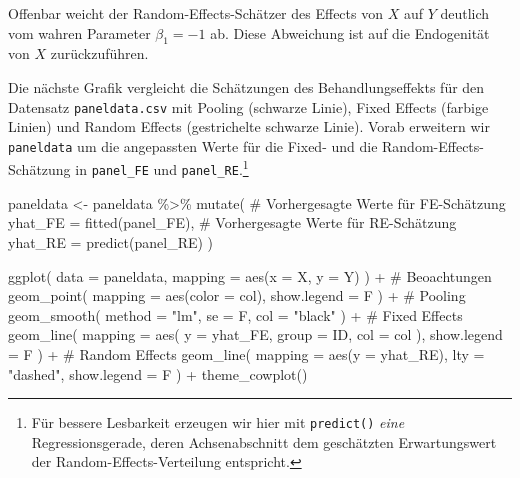 \documentclass[
  a4paper,
  DIV=11,
  oneside]{scrreprt}
\newenvironment{Shaded}{\begin{snugshade}}{\end{snugshade}}
\newcommand{\AttributeTok}[1]{\textcolor[rgb]{0.40,0.45,0.13}{#1}}
\newcommand{\CommentTok}[1]{\textcolor[rgb]{0.37,0.37,0.37}{#1}}
\newcommand{\FunctionTok}[1]{\textcolor[rgb]{0.28,0.35,0.67}{#1}}
\newcommand{\NormalTok}[1]{\textcolor[rgb]{0.00,0.23,0.31}{#1}}
\newcommand{\OtherTok}[1]{\textcolor[rgb]{0.00,0.23,0.31}{#1}}
\newcommand{\SpecialCharTok}[1]{\textcolor[rgb]{0.37,0.37,0.37}{#1}}
\newcommand{\StringTok}[1]{\textcolor[rgb]{0.13,0.47,0.30}{#1}}
\begin{document}
Offenbar weicht der Random-Effects-Schätzer des Effects von \(X\) auf
\(Y\) deutlich vom wahren Parameter \(\beta_1 = -1\) ab. Diese
Abweichung ist auf die Endogenität von \(X\) zurückzuführen.

Die nächste Grafik vergleicht die Schätzungen des Behandlungseffekts für
den Datensatz \texttt{paneldata.csv} mit Pooling (schwarze Linie), Fixed
Effects (farbige Linien) und Random Effects (gestrichelte schwarze
Linie). Vorab erweitern wir \texttt{paneldata} um die angepassten Werte
für die Fixed- und die Random-Effects-Schätzung in \texttt{panel\_FE}
und \texttt{panel\_RE}.\footnote{Für bessere Lesbarkeit erzeugen wir
  hier mit \texttt{predict()} \emph{eine} Regressionsgerade, deren
  Achsenabschnitt dem geschätzten Erwartungswert der
  Random-Effects-Verteilung entspricht.}

\begin{Shaded}
\begin{Highlighting}[]
\NormalTok{paneldata }\OtherTok{\textless{}{-}}\NormalTok{ paneldata }\SpecialCharTok{\%\textgreater{}\%} 
  \FunctionTok{mutate}\NormalTok{(}
    \CommentTok{\# Vorhergesagte Werte für FE{-}Schätzung}
    \AttributeTok{yhat\_FE =} \FunctionTok{fitted}\NormalTok{(panel\_FE),}
    \CommentTok{\# Vorhergesagte Werte für RE{-}Schätzung}
    \AttributeTok{yhat\_RE =} \FunctionTok{predict}\NormalTok{(panel\_RE)}
\NormalTok{  )}
\end{Highlighting}
\end{Shaded}

\begin{Shaded}
\begin{Highlighting}[]
\FunctionTok{ggplot}\NormalTok{(}
  \AttributeTok{data =}\NormalTok{ paneldata,}
  \AttributeTok{mapping =} \FunctionTok{aes}\NormalTok{(}\AttributeTok{x =}\NormalTok{ X, }\AttributeTok{y =}\NormalTok{ Y)}
\NormalTok{) }\SpecialCharTok{+}
  \CommentTok{\# Beoachtungen}
  \FunctionTok{geom\_point}\NormalTok{(}
    \AttributeTok{mapping =} \FunctionTok{aes}\NormalTok{(}\AttributeTok{color =}\NormalTok{ col), }
    \AttributeTok{show.legend =}\NormalTok{ F}
\NormalTok{  ) }\SpecialCharTok{+}
  \CommentTok{\# Pooling}
  \FunctionTok{geom\_smooth}\NormalTok{(}
    \AttributeTok{method =} \StringTok{"lm"}\NormalTok{, }
    \AttributeTok{se =}\NormalTok{ F,}
    \AttributeTok{col =} \StringTok{"black"}
\NormalTok{  ) }\SpecialCharTok{+}
  \CommentTok{\# Fixed Effects}
  \FunctionTok{geom\_line}\NormalTok{(}
    \AttributeTok{mapping =} \FunctionTok{aes}\NormalTok{(}
      \AttributeTok{y =}\NormalTok{ yhat\_FE,}
      \AttributeTok{group =}\NormalTok{ ID,}
      \AttributeTok{col =}\NormalTok{ col}
\NormalTok{    ), }
    \AttributeTok{show.legend =}\NormalTok{ F}
\NormalTok{  ) }\SpecialCharTok{+}
  \CommentTok{\# Random Effects}
  \FunctionTok{geom\_line}\NormalTok{(}
    \AttributeTok{mapping =} \FunctionTok{aes}\NormalTok{(}\AttributeTok{y =}\NormalTok{ yhat\_RE), }
    \AttributeTok{lty =} \StringTok{"dashed"}\NormalTok{, }
    \AttributeTok{show.legend =}\NormalTok{ F}
\NormalTok{  ) }\SpecialCharTok{+}
  \FunctionTok{theme\_cowplot}\NormalTok{()}
\end{Highlighting}
\end{Shaded}
\end{document}
